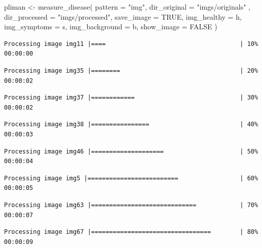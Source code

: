 \documentclass[
  letterpaper,
  DIV=11,
  numbers=noendperiod]{scrreprt}
\newenvironment{Shaded}{\begin{snugshade}}{\end{snugshade}}
\newcommand{\AttributeTok}[1]{\textcolor[rgb]{0.40,0.45,0.13}{#1}}
\newcommand{\ConstantTok}[1]{\textcolor[rgb]{0.56,0.35,0.01}{#1}}
\newcommand{\FunctionTok}[1]{\textcolor[rgb]{0.28,0.35,0.67}{#1}}
\newcommand{\NormalTok}[1]{\textcolor[rgb]{0.00,0.23,0.31}{#1}}
\newcommand{\OtherTok}[1]{\textcolor[rgb]{0.00,0.23,0.31}{#1}}
\newcommand{\StringTok}[1]{\textcolor[rgb]{0.13,0.47,0.30}{#1}}
\begin{document}
\begin{Shaded}
\begin{Highlighting}[]
\NormalTok{pliman }\OtherTok{\textless{}{-}} \FunctionTok{measure\_disease}\NormalTok{(}
  \AttributeTok{pattern =} \StringTok{"img"}\NormalTok{,}
  \AttributeTok{dir\_original =} \StringTok{"imgs/originals"}\NormalTok{ ,}
  \AttributeTok{dir\_processed =} \StringTok{"imgs/processed"}\NormalTok{,}
  \AttributeTok{save\_image =} \ConstantTok{TRUE}\NormalTok{,}
  \AttributeTok{img\_healthy =}\NormalTok{ h,}
  \AttributeTok{img\_symptoms =}\NormalTok{ s,}
  \AttributeTok{img\_background =}\NormalTok{ b,}
  \AttributeTok{show\_image =} \ConstantTok{FALSE}
\NormalTok{)}
\end{Highlighting}
\end{Shaded}

\begin{verbatim}
Processing image img11 |====                                     | 10% 00:00:00 
\end{verbatim}

\begin{verbatim}
Processing image img35 |========                                 | 20% 00:00:02 
\end{verbatim}

\begin{verbatim}
Processing image img37 |============                             | 30% 00:00:02 
\end{verbatim}

\begin{verbatim}
Processing image img38 |================                         | 40% 00:00:03 
\end{verbatim}

\begin{verbatim}
Processing image img46 |====================                     | 50% 00:00:04 
\end{verbatim}

\begin{verbatim}
Processing image img5 |=========================                 | 60% 00:00:05 
\end{verbatim}

\begin{verbatim}
Processing image img63 |=============================            | 70% 00:00:07 
\end{verbatim}

\begin{verbatim}
Processing image img67 |=================================        | 80% 00:00:09 
\end{verbatim}
\end{document}
